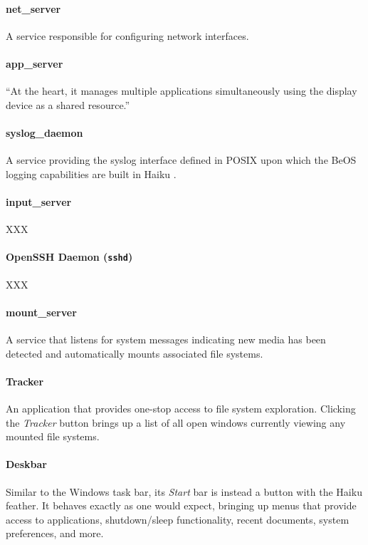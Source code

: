 \documentclass{article}
\begin{document}
\paragraph{net\_server}
A service responsible for configuring network
interfaces. \cite{NetServerSource}

\paragraph{app\_server}
``At the heart, it manages multiple applications simultaneously using
the display device as a shared resource.''\cite{AppServer}

\paragraph{syslog\_daemon}
A service providing the syslog interface defined in POSIX upon which
the BeOS logging capabilities are built in Haiku \cite{SyslogInfo}.

\paragraph{input\_server}
XXX

\paragraph{OpenSSH Daemon (\texttt{sshd})}
XXX

\paragraph{mount\_server}
A service that listens for system messages indicating new media has
been detected and automatically mounts associated
file systems.\cite{AutoMounter}

\paragraph{Tracker}
An application that provides one-stop access to file system
exploration. Clicking the \textit{Tracker} button brings up a list of
all open windows currently viewing any mounted file
systems.\cite{Tracker}

\paragraph{Deskbar}
Similar to the Windows task bar, its \textit{Start} bar is instead a
button with the Haiku feather. It behaves exactly as one would expect,
bringing up menus that provide access to applications, shutdown/sleep
functionality, recent documents, system preferences, and
more.\cite{Deskbar}
\end{document}
